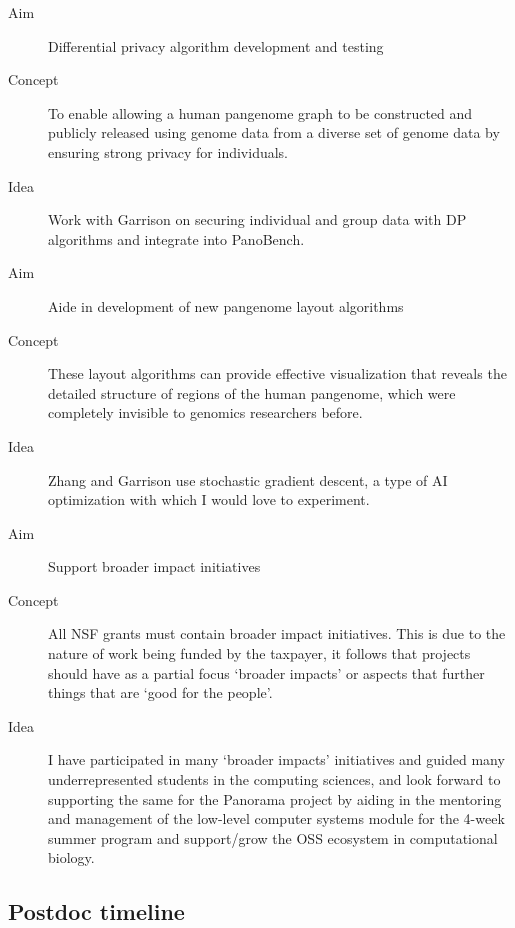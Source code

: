 \begin{description}
	\item[Aim] Differential privacy algorithm development and testing
	\item[Concept] To enable allowing a human pangenome graph to be constructed and publicly released using genome data from a diverse set of genome data by ensuring strong privacy for individuals.
	\item[Idea] Work with Garrison on securing individual and group data with DP algorithms and integrate into PanoBench.
\end{description}

\begin{description}
	\item[Aim] Aide in development of new pangenome layout algorithms
	\item[Concept] These layout algorithms can provide effective visualization that reveals the detailed structure of regions of the human pangenome, which were completely invisible to genomics researchers before.
	\item[Idea] Zhang and Garrison use stochastic gradient descent, a type of AI optimization with which I would love to experiment.
\end{description}

\begin{description}
	\item[Aim] Support broader impact initiatives 
	\item[Concept] All NSF grants must contain broader impact initiatives. This is due to the nature of work being funded by the taxpayer, it follows that projects should have as a partial focus `broader impacts' or aspects that further things that are `good for the people'.
	\item[Idea] I have participated in many `broader impacts' initiatives and guided many underrepresented students in the computing sciences, and look forward to supporting the same for the Panorama project by aiding in the mentoring and management of the low-level computer systems module for the 4-week summer program and support/grow the OSS ecosystem in computational biology.
\end{description}


\subsection{Postdoc timeline}
